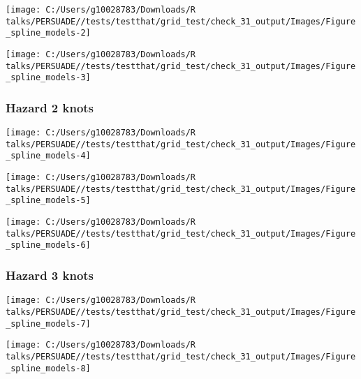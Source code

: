 \documentclass[
]{article}
\begin{document}
\begin{flushleft}\texttt{[image: C:/Users/g10028783/Downloads/R talks/PERSUADE//tests/testthat/grid\_test/check\_31\_output/Images/Figure\_spline\_models-2]} \end{flushleft}

\begin{flushleft}\texttt{[image: C:/Users/g10028783/Downloads/R talks/PERSUADE//tests/testthat/grid\_test/check\_31\_output/Images/Figure\_spline\_models-3]} \end{flushleft}

\clearpage

\subsubsection{Hazard 2 knots}\label{hazard-2-knots}

\begin{flushleft}\texttt{[image: C:/Users/g10028783/Downloads/R talks/PERSUADE//tests/testthat/grid\_test/check\_31\_output/Images/Figure\_spline\_models-4]} \end{flushleft}

\begin{flushleft}\texttt{[image: C:/Users/g10028783/Downloads/R talks/PERSUADE//tests/testthat/grid\_test/check\_31\_output/Images/Figure\_spline\_models-5]} \end{flushleft}

\begin{flushleft}\texttt{[image: C:/Users/g10028783/Downloads/R talks/PERSUADE//tests/testthat/grid\_test/check\_31\_output/Images/Figure\_spline\_models-6]} \end{flushleft}

\clearpage

\subsubsection{Hazard 3 knots}\label{hazard-3-knots}

\begin{flushleft}\texttt{[image: C:/Users/g10028783/Downloads/R talks/PERSUADE//tests/testthat/grid\_test/check\_31\_output/Images/Figure\_spline\_models-7]} \end{flushleft}

\begin{flushleft}\texttt{[image: C:/Users/g10028783/Downloads/R talks/PERSUADE//tests/testthat/grid\_test/check\_31\_output/Images/Figure\_spline\_models-8]} \end{flushleft}
\end{document}
